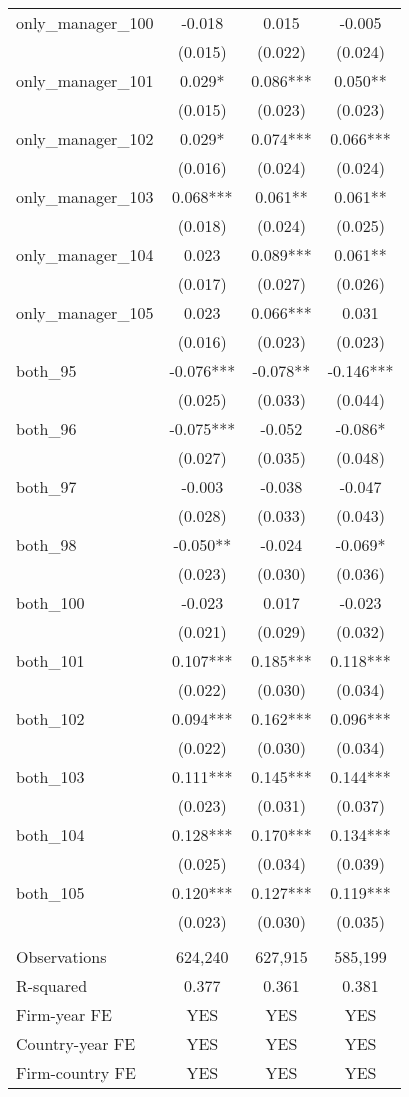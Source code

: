 \begin{tabular}{lccc}
only\_manager\_100 & -0.018 & 0.015 & -0.005 \\
 & (0.015) & (0.022) & (0.024) \\
only\_manager\_101 & 0.029* & 0.086*** & 0.050** \\
 & (0.015) & (0.023) & (0.023) \\
only\_manager\_102 & 0.029* & 0.074*** & 0.066*** \\
 & (0.016) & (0.024) & (0.024) \\
only\_manager\_103 & 0.068*** & 0.061** & 0.061** \\
 & (0.018) & (0.024) & (0.025) \\
only\_manager\_104 & 0.023 & 0.089*** & 0.061** \\
 & (0.017) & (0.027) & (0.026) \\
only\_manager\_105 & 0.023 & 0.066*** & 0.031 \\
 & (0.016) & (0.023) & (0.023) \\
both\_95 & -0.076*** & -0.078** & -0.146*** \\
 & (0.025) & (0.033) & (0.044) \\
both\_96 & -0.075*** & -0.052 & -0.086* \\
 & (0.027) & (0.035) & (0.048) \\
both\_97 & -0.003 & -0.038 & -0.047 \\
 & (0.028) & (0.033) & (0.043) \\
both\_98 & -0.050** & -0.024 & -0.069* \\
 & (0.023) & (0.030) & (0.036) \\
both\_100 & -0.023 & 0.017 & -0.023 \\
 & (0.021) & (0.029) & (0.032) \\
both\_101 & 0.107*** & 0.185*** & 0.118*** \\
 & (0.022) & (0.030) & (0.034) \\
both\_102 & 0.094*** & 0.162*** & 0.096*** \\
 & (0.022) & (0.030) & (0.034) \\
both\_103 & 0.111*** & 0.145*** & 0.144*** \\
 & (0.023) & (0.031) & (0.037) \\
both\_104 & 0.128*** & 0.170*** & 0.134*** \\
 & (0.025) & (0.034) & (0.039) \\
both\_105 & 0.120*** & 0.127*** & 0.119*** \\
 & (0.023) & (0.030) & (0.035) \\
 &  &  &  \\
Observations & 624,240 & 627,915 & 585,199 \\
R-squared & 0.377 & 0.361 & 0.381 \\
Firm-year FE & YES & YES & YES \\
Country-year FE & YES & YES & YES \\
 Firm-country FE & YES & YES & YES \\ \hline
\end{tabular}
